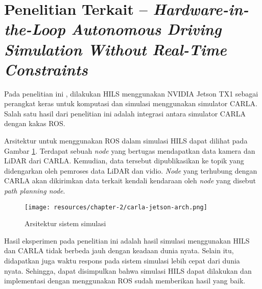 \section{Penelitian Terkait -- \textit{Hardware-in-the-Loop Autonomous Driving Simulation Without
	  Real-Time Constraints}}\label{chapter-2-section-related-works}

Pada penelitian ini \parencite{brogle_CarlaHILS}, dilakukan HILS menggunakan
NVIDIA Jetson TX1 sebagai perangkat keras untuk komputasi dan simulasi
menggunakan simulator CARLA. Salah satu hasil dari penelitian ini adalah
integrasi antara simulator CARLA dengan kakas ROS.

Arsitektur untuk menggunakan ROS dalam simulasi HILS dapat dilihat pada Gambar
\ref{chapter-2-carla-jetson-arch}. Terdapat sebuah \textit{node}  yang
bertugas mendapatkan data kamera dan LiDAR dari CARLA. Kemudian, data tersebut
dipublikasikan ke topik yang didengarkan oleh pemroses data LiDAR dan vidio.
\textit{Node} yang terhubung dengan CARLA akan dikirimkan data terkait kendali
kendaraan oleh \textit{node} yang disebut \textit{path planning node}.

\begin{figure}[h!]
	\centering
	\texttt{[image: resources/chapter-2/carla-jetson-arch.png]}
	\caption{Arsitektur sistem simulasi \parencite{brogle_CarlaHILS}}
	\label{chapter-2-carla-jetson-arch}
\end{figure}

Hasil eksperimen pada penelitian ini adalah hasil simulasi menggunakan HILS dan
CARLA tidak berbeda jauh dengan keadaan dunia nyata. Selain itu, didapatkan juga
waktu respons pada sistem simulasi lebih cepat dari dunia nyata. Sehingga, dapat
disimpulkan bahwa simulasi HILS dapat dilakukan dan implementasi dengan
menggunakan ROS sudah memberikan hasil yang baik.
